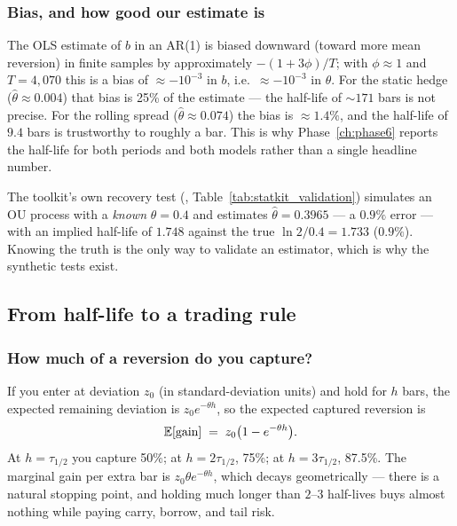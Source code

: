 \subsubsection{Bias, and how good our estimate is}

The OLS estimate of $b$ in an AR(1) is biased downward (toward more mean reversion) in
finite samples by approximately $-(1+3\phi)/T$; with $\phi\approx1$ and $T=4{,}070$ this
is a bias of $\approx-10^{-3}$ in $b$, i.e.\ $\approx-10^{-3}$ in $\theta$. For the
static hedge ($\hat\theta\approx0.004$) that bias is 25\% of the estimate --- the
half-life of $\sim171$ bars is not precise. For the rolling spread
($\hat\theta\approx0.074$) the bias is $\approx1.4\%$, and the half-life of $9.4$ bars is
trustworthy to roughly a bar. This is why Phase~\ref{ch:phase6} reports the half-life
for both periods and both models rather than a single headline number.

The toolkit's own recovery test (,
Table~\ref{tab:statkit_validation}) simulates an OU process with a \emph{known}
$\theta=0.4$ and estimates $\hat\theta=0.3965$ --- a $0.9\%$ error --- with an implied
half-life of $1.748$ against the true $\ln 2/0.4 = 1.733$ ($0.9\%$). Knowing the truth is
the only way to validate an estimator, which is why the synthetic tests exist.

\subsection{From half-life to a trading rule}
\label{sec:ou:trading}

\subsubsection{How much of a reversion do you capture?}

If you enter at deviation $z_0$ (in standard-deviation units) and hold for $h$ bars, the
expected remaining deviation is $z_0e^{-\theta h}$, so the expected captured reversion is
\begin{equation}
  \mathbb{E}[\text{gain}] \;=\; z_0\bigl(1-e^{-\theta h}\bigr) .
  \label{eq:ou:gain}
\end{equation}
At $h=\tau_{1/2}$ you capture 50\%; at $h=2\tau_{1/2}$, 75\%; at $h=3\tau_{1/2}$,
87.5\%. The marginal gain per extra bar is $z_0\theta e^{-\theta h}$, which decays
geometrically --- there is a natural stopping point, and holding much longer than
$2$--$3$ half-lives buys almost nothing while paying carry, borrow, and tail risk.

